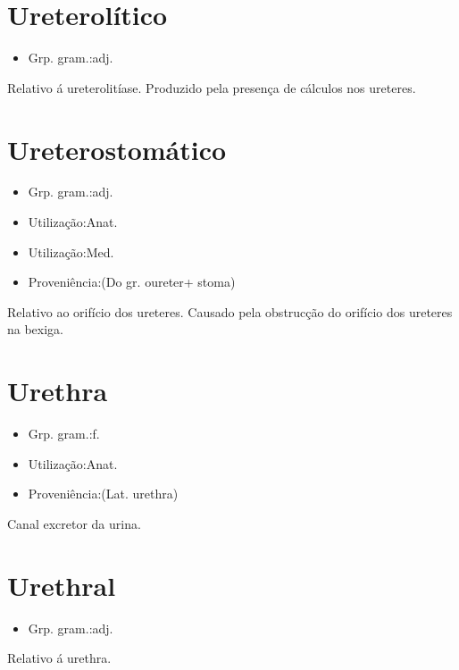 \documentclass{article}
\begin{document}
\section{Ureterolítico}
\begin{itemize}
\item {Grp. gram.:adj.}
\end{itemize}
Relativo á ureterolitíase.
Produzido pela presença de cálculos nos ureteres.
\section{Ureterostomático}
\begin{itemize}
\item {Grp. gram.:adj.}
\end{itemize}
\begin{itemize}
\item {Utilização:Anat.}
\end{itemize}
\begin{itemize}
\item {Utilização:Med.}
\end{itemize}
\begin{itemize}
\item {Proveniência:(Do gr. \textunderscore oureter\textunderscore  + \textunderscore stoma\textunderscore )}
\end{itemize}
Relativo ao orifício dos ureteres.
Causado pela obstrucção do orifício dos ureteres na bexiga.
\section{Urethra}
\begin{itemize}
\item {Grp. gram.:f.}
\end{itemize}
\begin{itemize}
\item {Utilização:Anat.}
\end{itemize}
\begin{itemize}
\item {Proveniência:(Lat. \textunderscore urethra\textunderscore )}
\end{itemize}
Canal excretor da urina.
\section{Urethral}
\begin{itemize}
\item {Grp. gram.:adj.}
\end{itemize}
Relativo á urethra.
\end{document}
